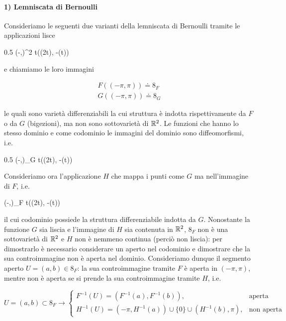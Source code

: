 \paragraph{1) Lemniscata di Bernoulli}

Consideriamo le seguenti due varianti della lemniscata di Bernoulli tramite le applicazioni lisce

	{0.5}{%
				{(-\pi,\pi)}{\R^{2}}
				{t}{(\sin(2t), -\sin(t))}
			}

e chiamiamo le loro immagini

\begin{gather}
	F((-\pi,\pi)) \doteq \mathfrak{8}_{F} \\
	G((-\pi,\pi)) \doteq \mathfrak{8}_{G}
\end{gather}

le quali sono varietà differenziabili la cui struttura è indotta rispettivamente da $ F $ o da $ G $ (bigezioni), ma non sono sottovarietà di $ \mathbb{R}^{2} $. Le funzioni che hanno lo stesso dominio e come codominio le immagini del dominio sono diffeomorfismi, i.e.

\sbs{0.5}{%
			\map{\tilde{F}}
				{(-\pi,\pi)}{\mathfrak{8}_{F}}
				{t}{(\sin(2t), \sin(t))}
			}
	{0.5}{%
				{(-\pi,\pi)}{_{G}}
				{t}{(\sin(2t), -\sin(t))}
			}
		
		\img{0.8}{img41}

Consideriamo ora l'applicazione $ H $ che mappa i punti come $ G $ ma nell'immagine di $ F $, i.e.

	{(-\pi,\pi)}{_{F}}
	{t}{(\sin(2t), -\sin(t))}

il cui codominio possiede la struttura differenziabile indotta da $ G $. Nonostante la funzione $ G $ sia liscia e l'immagine di $ H $ sia contenuta in $ \mathbb{R}^{2} $, $ \mathfrak{8}_{F} $ non è una sottovarietà di $ \mathbb{R}^{2} $ e $ H $ non è nemmeno continua (perciò non liscia): per dimostrarlo è necessario considerare un aperto nel codominio e dimostrare che la sua controimmagine non è aperta nel dominio. Consideriamo dunque il segmento aperto $ U = (a,b) \in \mathfrak{8}_{F} $: la sua controimmagine tramite $ F $ è aperta in $ (-\pi,\pi) $, mentre non è aperta se si prende la sua controimmagine tramite $ H $, i.e.

\begin{equation}
	U = (a,b) \subset \mathfrak{8}_{F} %
	\rightarrow %
	\begin{cases}
		F^{-1}(U) = (F^{-1}(a),F^{-1}(b)), & \text{aperta} \\
		H^{-1}(U) = (-\pi,H^{-1}(a)) \cup \{0\} \cup (H^{-1}(b),\pi), & \text{non aperta}
	\end{cases}
\end{equation}

